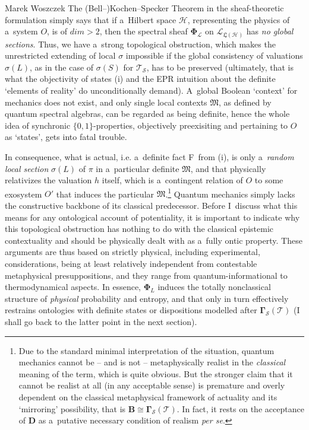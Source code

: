 \begin{artengenv}{Marek Woszczek}
The (Bell–)Kochen–Specker Theorem in the sheaf-theoretic formulation simply says that if a~Hilbert space $\mathcal{H}$, representing the physics of a~system $O$, is of $\mathit{dim} > 2$, then the spectral sheaf $\bm{\Phi}_{\mathcal{L}}$ on $\mathcal{L}_{\bm{\mathfrak{L}}(\mathcal{H})}$ has \textit{no global sections}. Thus, we have a~strong topological obstruction, which makes the unrestricted extending of local $\sigma$ impossible if the global consistency of valuations $\sigma (L)$, as in the case of $\sigma (S)$ for $\mathcal{T}_{\mathcal{S}}$, has to be preserved (ultimately, that is what the objectivity of states (i) and the EPR intuition about the definite ‘elements of reality' do unconditionally demand). A~global Boolean ‘context' for mechanics does not exist, and only single local contexts $\bm{\mathfrak{M}}$, as defined by quantum spectral algebras, can be regarded as being definite, hence the whole idea of synchronic $\{0,1\}$-properties, objectively preexisiting and pertaining to $O$ as ‘states', gets into fatal trouble.

In consequence, what is actual, i.e. a~definite fact F~from (i), is only a~\textit{random local section} $\sigma (L)$ of $\pi$ in a~particular definite $\bm{\mathfrak{M}}$, and that physically relativizes the valuation $h$ itself, which is a~contingent relation of $O$ to some exosystem $O'$ that induces the particular $\bm{\mathfrak{M}}$.\footnote{Due to the standard minimal interpretation of the situation, quantum mechanics cannot be -- and is not -- metaphysically realist in the \textit{classical} meaning of the term, which is quite obvious. But the stronger claim that it cannot be realist at all (in any acceptable sense) is premature and overly dependent on the classical metaphysical framework of actuality and its ‘mirroring' possibility, that is $\bm{B\cong\Gamma}_{\mathcal{S}}(\mathcal{T})$. In fact, it rests on the acceptance of \textbf{D} as a~putative necessary condition of realism \textit{per se}.} Quantum mechanics simply lacks the constructive backbone of its classical predecessor. Before I~discuss what this means for any ontological account of potentiality, it is important to indicate why this topological obstruction has nothing to do with the classical epistemic contextuality and should be physically dealt with as a~fully ontic property. These arguments are thus based on strictly physical, including experimental, considerations, being at least relatively independent from contestable metaphysical presuppositions, and they range from quantum-informational to thermodynamical aspects. In essence, $\bm{\Phi}_L$ induces the totally nonclassical structure of \textit{physical} probability and entropy, and that only in turn effectively restrains ontologies with definite states or dispositions modelled after $\bm{\Gamma}_{\mathcal{S}}(\mathcal{T})$ (I shall go back to the latter point in the next section).


\end{artengenv}

